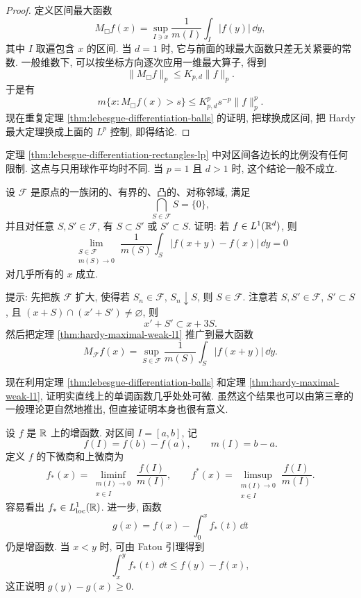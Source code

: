 \begin{proof}
	定义区间最大函数
	\[
	M_{\Box}f(x)=\sup_{I\ni x}
	\frac{1}{m(I)}\int_I |f(y)|\,\dd y,
	\]
	其中 \(I\) 取遍包含 \(x\) 的区间. 当 \(d=1\) 时, 它与前面的球最大函数只差无关紧要的常数. 一般维数下, 可以按坐标方向逐次应用一维最大算子, 得到
	\[
	\|M_{\Box}f\|_p\leq K_{p,d}\|f\|_p.
	\]
	于是有
	\[
	m\{x:M_{\Box}f(x)>s\}
	\leq
	K_{p,d}^p s^{-p}\|f\|_p^p.
	\]
	现在重复定理 \ref{thm:lebesgue-differentiation-balls} 的证明, 把球换成区间, 把 Hardy 最大定理换成上面的 \(L^p\) 控制, 即得结论.
\end{proof}

\begin{rem}
	定理 \ref{thm:lebesgue-differentiation-rectangles-lp} 中对区间各边长的比例没有任何限制. 这点与只用球作平均时不同. 当 \(p=1\) 且 \(d>1\) 时, 这个结论一般不成立.
\end{rem}

\begin{exer}\label{exer:convex-neighborhood-differentiation}
	设 \(\mathcal F\) 是原点的一族闭的、有界的、凸的、对称邻域, 满足
	\[
	\bigcap_{S\in\mathcal F}S=\{0\},
	\]
	并且对任意 \(S,S'\in\mathcal F\), 有 \(S\subset S'\) 或 \(S'\subset S\). 证明: 若 \(f\in L^1(\mathbb{R}^d)\), 则
	\[
	\lim_{\substack{S\in\mathcal F\\ m(S)\to0}}
	\frac{1}{m(S)}\int_S |f(x+y)-f(x)|\,\dd y=0
	\]
	对几乎所有的 \(x\) 成立.
	
	提示: 先把族 \(\mathcal F\) 扩大, 使得若 \(S_n\in\mathcal F\), \(S_n\downarrow S\), 则 \(S\in\mathcal F\). 注意若 \(S,S'\in\mathcal F\), \(S'\subset S\), 且 \((x+S)\cap(x'+S')\neq\varnothing\), 则
	\[
	x'+S'\subset x+3S.
	\]
	然后把定理 \ref{thm:hardy-maximal-weak-l1} 推广到最大函数
	\[
	M_{\mathcal F}f(x)=\sup_{S\in\mathcal F}
	\frac{1}{m(S)}\int_S |f(x+y)|\,\dd y.
	\]
\end{exer}

现在利用定理 \ref{thm:lebesgue-differentiation-balls} 和定理 \ref{thm:hardy-maximal-weak-l1}, 证明实直线上的单调函数几乎处处可微. 虽然这个结果也可以由第三章的一般理论更自然地推出, 但直接证明本身也很有意义.

设 \(f\) 是 \(\mathbb{R}\) 上的增函数. 对区间 \(I=[a,b]\), 记
\[
f(I)=f(b)-f(a),
\qquad
m(I)=b-a.
\]
定义 \(f\) 的下微商和上微商为
\[
f_*(x)=\liminf_{\substack{m(I)\to0\\x\in I}}\frac{f(I)}{m(I)},
\qquad
f^*(x)=\limsup_{\substack{m(I)\to0\\x\in I}}\frac{f(I)}{m(I)}.
\]
容易看出 \(f_*\in L^1_{\operatorname{loc}}(\mathbb{R})\). 进一步, 函数
\[
g(x)=f(x)-\int_0^x f_*(t)\,\dd t
\]
仍是增函数. 当 \(x<y\) 时, 可由 Fatou 引理得到
\[
\int_x^y f_*(t)\,\dd t\leq f(y)-f(x),
\]
这正说明 \(g(y)-g(x)\geq0\).

